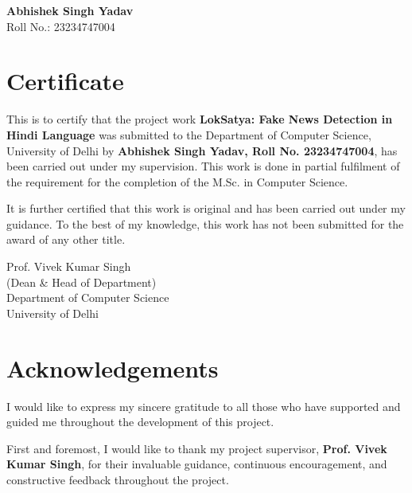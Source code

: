 \documentclass[12pt,a4paper]{report}
\begin{document}
\vspace{3cm} 

\begin{flushright}
    \textbf{Abhishek Singh Yadav} \\ 
    Roll No.: 23234747004 \\  
\end{flushright}

\chapter*{Certificate}

This is to certify that the project work \textbf{LokSatya: Fake News Detection in Hindi Language} was submitted to the Department of Computer Science, University of Delhi by \textbf{Abhishek Singh Yadav, Roll No. 23234747004}, has been carried out under my supervision. This work is done in partial fulfilment of the requirement for the completion of the M.Sc. in Computer Science.

It is further certified that this work is original and has been carried out under my guidance. To the best of my knowledge, this work has not been submitted for the award of any other title.

\vspace{3cm} 

\begin{flushright}
    Prof. Vivek Kumar Singh \\ 
    (Dean & Head of Department) \\ 
    Department of Computer Science \\ 
    University of Delhi \\ 

\end{flushright}

\chapter*{Acknowledgements}

I would like to express my sincere gratitude to all those who have supported and guided me throughout the development of this project.

First and foremost, I would like to thank my project supervisor, \textbf{Prof. Vivek Kumar Singh}, for their invaluable guidance, continuous encouragement, and constructive feedback throughout the project.
\end{document}
